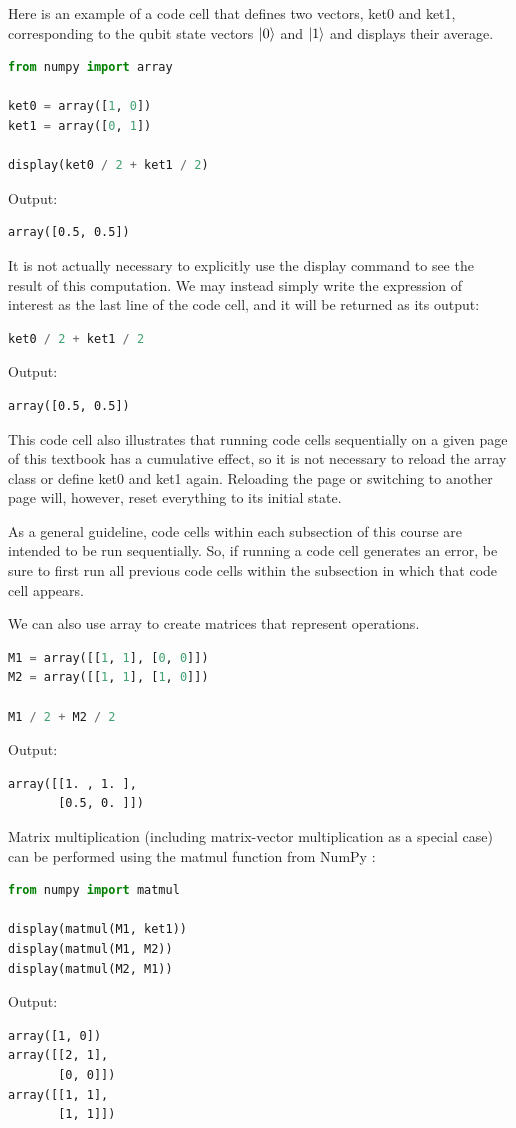 Here is an example of a code cell that defines two vectors,  ket0  and  ket1, corresponding to the qubit state vectors $\ket{0}$ and $\ket{1}$ and displays their average.
\begin{lstlisting}[language=Python]
from numpy import array

ket0 = array([1, 0])
ket1 = array([0, 1])

display(ket0 / 2 + ket1 / 2)
\end{lstlisting}
Output:
\begin{lstlisting}
array([0.5, 0.5])
\end{lstlisting}
It is not actually necessary to explicitly use the  display  command to see the result of this computation. We may instead simply write the expression of interest as the last line of the code cell, and it will be returned as its output:
\begin{lstlisting}[language=Python]
ket0 / 2 + ket1 / 2
\end{lstlisting}
Output:
\begin{lstlisting}
array([0.5, 0.5])
\end{lstlisting}

This code cell also illustrates that running code cells sequentially on a given page of this textbook has a cumulative effect, so it is not necessary to reload the  array  class or define ket0  and  ket1  again. Reloading the page or switching to another page will, however, reset everything to its initial state.

As a general guideline, code cells within each subsection of this course are intended to be run sequentially. So, if running a code cell generates an error, be sure to first run all previous code cells within the subsection in which that code cell appears.

We can also use  array  to create matrices that represent operations.
\begin{lstlisting}[language=Python]
M1 = array([[1, 1], [0, 0]])
M2 = array([[1, 1], [1, 0]])

M1 / 2 + M2 / 2
\end{lstlisting}
Output:
\begin{lstlisting}
array([[1. , 1. ],
       [0.5, 0. ]])
\end{lstlisting}
Matrix multiplication (including matrix-vector multiplication as a special case) can be performed using the  matmul  function from  NumPy  :
\begin{lstlisting}[language=Python]
from numpy import matmul

display(matmul(M1, ket1))
display(matmul(M1, M2))
display(matmul(M2, M1))
\end{lstlisting}
Output:
\begin{lstlisting}
array([1, 0])
array([[2, 1],
       [0, 0]])
array([[1, 1],
       [1, 1]])
\end{lstlisting}

